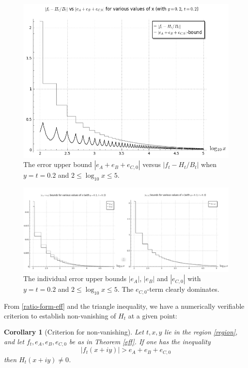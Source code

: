 \documentclass[a4paper,11pt,twoside]{amsart}
\newtheorem{corollary}[theorem]{Corollary}
\begin{document}
\begin{figure}[ht!]
  \includegraphics[width=0.8\linewidth]{ft_min_Ht_vs_errorterms.png}
  \caption{The error upper bound $|e_A+e_B+e_{C,0}|$ versus $|f_t - H_t/B_t|$ when $y=t=0.2$ and $2 \leq \log_{10} x \leq 5$.}
\label{errorboundtot}
\end{figure}

\begin{figure}[ht!]
  \includegraphics[width=1.0\linewidth]{eA_eB_eC_errorbounds.png}
  \caption{The individual error upper bounds $|e_A|$, $|e_B|$ and $|e_{C,0}|$ with $y=t=0.2$ and $2 \leq \log_{10} x \leq 5$. The $e_{C,0}$-term clearly dominates.}
\label{ind_errorbounds}
\end{figure}

From \eqref{ratio-form-eff} and the triangle inequality, we have a numerically verifiable criterion to establish non-vanishing of $H_t$ at a given point:

\begin{corollary}[Criterion for non-vanishing]\label{zero-test}  Let $t,x,y$ lie in the region \eqref{region}, and let $f_t, e_A, e_B, e_{C,0}$ be as in Theorem \ref{eff}.  If one has the inequality
\begin{equation}\label{criterion}
|f_t(x+iy)| > e_A + e_B + e_{C,0} 
\end{equation}
then $H_t(x+iy) \neq 0$.  
\end{corollary}
\end{document}
